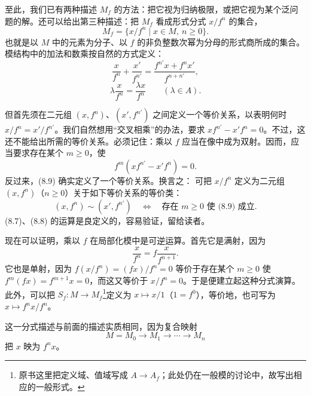 至此，我们已有两种描述 $M_f$ 的方法：把它视为归纳极限，或把它视为某个泛问题的解。还可以给出第三种描述：把 $M_f$ 看成形式分式 $x/f^n$ 的集合，
\begin{equation}\tag{8.6}
M_f=\{x/f^n\mid x\in M,\ n\ge0\}.
\end{equation}
也就是以 $M$ 中的元素为分子、以 $f$ 的非负整数次幂为分母的形式商所成的集合。模结构中的加法和数乘按自然的方式定义：
\begin{equation}\tag{8.7}
\frac{x}{f^n}+\frac{x'}{f^{n'}}=
\frac{f^{n'}x+f^nx'}{f^{n+n'}},
\end{equation}
\begin{equation}\tag{8.8}
\lambda\frac{x}{f^n}=\frac{\lambda x}{f^n}\qquad(\lambda\in A).
\end{equation}

但首先须在二元组 $(x,f^n)$、$(x',f^{n'})$ 之间定义一个等价关系，以表明何时 $x/f^n=x'/f^{n'}$。我们自然想用“交叉相乘”的办法，要求 $xf^{n'}-x'f^n=0$。不过，这还不能给出所需的等价关系。必须记住：乘以 $f$ 应当在像中成为双射。因而，应当要求存在某个 $m\ge0$，使
\begin{equation}\tag{8.9}
f^m(xf^{n'}-x'f^n)=0.
\end{equation}
反过来，(8.9) 确实定义了一个等价关系。换言之：
可把 $x/f^n$ 定义为二元组 $(x,f^n)$（$n\ge0$）关于如下等价关系的等价类：
\begin{equation}\tag{8.10}
(x,f^n)\sim(x',f^{n'})
\quad\Longleftrightarrow\quad
\text{存在 }m\ge0\text{ 使 (8.9) 成立}.
\end{equation}
(8.7)、(8.8) 的运算是良定义的，容易验证，留给读者。

现在可以证明，乘以 $f$ 在局部化模中是可逆运算。首先它是满射，因为
\[
\frac{x}{f^n}=f\frac{x}{f^{n+1}}.
\]
它也是单射，因为 $f(x/f^n)=(fx)/f^n=0$ 等价于存在某个 $m\ge0$ 使 $f^m(fx)=f^{m+1}x=0$，而这又等价于 $x/f^n=0$。于是便建立起这种分式演算。此外，可以把 $S_f:M\to M_f$\footnote{原书这里把定义域、值域写成 $A\to A_f$；此处仍在一般模的讨论中，故写出相应的一般形式。}定义为 $x\mapsto x/1$（$1=f^0$），等价地，也可写为 $x\mapsto f^nx/f^n$。

这一分式描述与前面的描述实质相同，因为复合映射
\[
M=M_0\longrightarrow M_1\longrightarrow\cdots\longrightarrow M_n
\]
把 $x$ 映为 $f^nx$。


